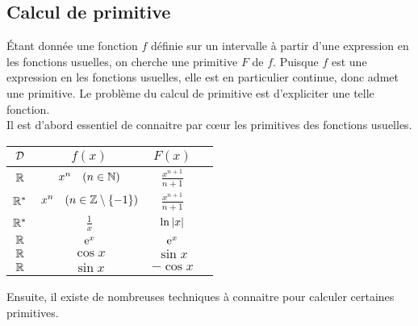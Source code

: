 \documentclass{magnolia}
\begin{document}
\subsection{Calcul de primitive}

Étant donnée une fonction $f$ définie sur un intervalle à partir d'une
expression en les fonctions usuelles, on cherche une primitive $F$ de $f$.
Puisque $f$ est une expression en les fonctions usuelles, elle est en
particulier continue, donc admet une primitive. Le problème du calcul de
primitive est d'expliciter une telle fonction.\\

Il est d'abord essentiel de connaitre par cœur les primitives des fonctions usuelles.

\begin{center}
\begin{tabular}{|c|c|c|c|}
\hline
$\mathcal{D}$ & $f(x)$ & $F(x)$\\
\hline
$\mathbb{R}$ & $x^n \quad (n\in\mathbb{N})$ & $\frac{x^{n+1}}{n+1}$\\
\hline
${\mathbb{R}^*}$ & $x^n \quad (n\in\mathbb{Z}\setminus\left\{-1\right\})$ & $\frac{x^{n+1}}{n+1}$\\
\hline
${\mathbb{R}^*}$ & $\frac{1}{x}$ & $\ln\left|x\right|$\\
\hline
\hline
$\mathbb{R}$ & ${\rm e}^x$ & ${\rm e}^x$\\
\hline
$\mathbb{R}$ & $\cos x$ & $\sin x$\\
\hline
$\mathbb{R}$ & $\sin x$ & $-\cos x$\\
\hline
\end{tabular}
\end{center}

Ensuite, il existe de nombreuses techniques à connaitre pour calculer certaines primitives.
\end{document}
